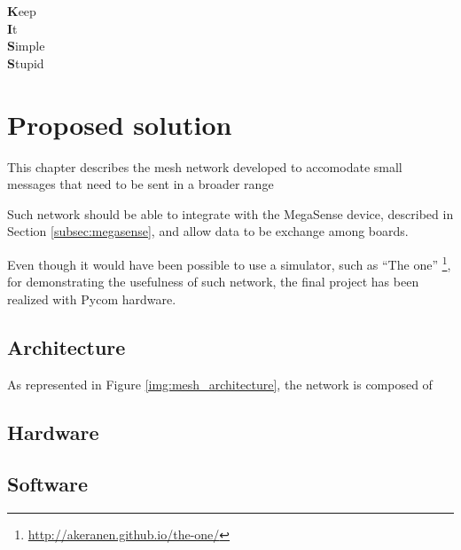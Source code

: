 
\begin{savequote}[40mm]
	\textbf{K}eep\\
	\textbf{I}t\\
	\textbf{S}imple\\
	\textbf{S}tupid
\end{savequote}

\chapter{Proposed solution}\label{chapter:proposed_solution}

	This chapter describes the mesh network developed to accomodate small messages that need to be sent in a broader range
	
	Such network should be able to integrate with the MegaSense device, described in Section \ref{subsec:megasense}, and allow data to be exchange among boards.
	
	Even though it would have been possible to use a simulator, such as ``The one'' \footnote{ \url{http://akeranen.github.io/the-one/}}, for demonstrating the usefulness of such network, the final project has been realized with Pycom hardware.
	
	\section{Architecture}
	
		
		As represented in Figure \ref{img:mesh_architecture}, the network is composed of 
	
	\section{Hardware}
	
	
	\section{Software}
	
	
